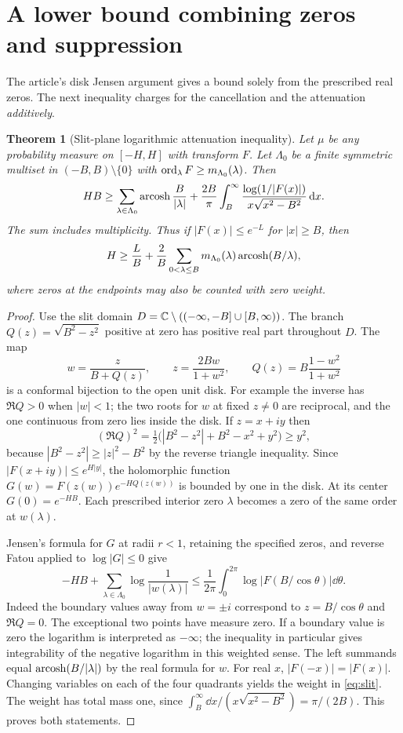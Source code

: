 \documentclass[11pt]{article}
\newtheorem{theorem}{Theorem}[section]
\theoremstyle{definition}\newtheorem{definition}[theorem]{Definition}
\begin{document}
\section{A lower bound combining zeros and suppression}
The article's disk Jensen argument gives a bound solely from the prescribed real zeros. The next inequality charges for the cancellation and the attenuation \emph{additively}.

\begin{theorem}[Slit-plane logarithmic attenuation inequality]\label{thm:slit}
Let $\mu$ be any probability measure on $[-H,H]$ with transform $F$. Let $\Lambda_0$ be a finite symmetric multiset in $(-B,B)\setminus\{0\}$ with $\operatorname{ord}_\lambda F\ge m_{\Lambda_0}(\lambda)$. Then
\begin{equation}\label{eq:slit}
 HB\ge \sum_{\lambda\in\Lambda_0}\operatorname{arcosh}\frac{B}{|\lambda|}
 +\frac{2B}{\pi}\int_B^\infty\frac{\log(1/|F(x)|)}{x\sqrt{x^2-B^2}}\,\mathrm d x.
\end{equation}
The sum includes multiplicity. Thus if $|F(x)|\le e^{-L}$ for $|x|\ge B$, then
\begin{equation}\label{eq:additive}
 H\ge\frac{L}{B}+\frac{2}{B}\sum_{0<\lambda\le B}m_{\Lambda_0}(\lambda)\operatorname{arcosh}(B/\lambda),
\end{equation}
where zeros at the endpoints may also be counted with zero weight.
\end{theorem}
\begin{proof}
Use the slit domain $D=\mathbb C\setminus(({-\infty},-B]\cup[B,\infty))$. The branch $Q(z)=\sqrt{B^2-z^2}$ positive at zero has positive real part throughout $D$. The map
\[
 w=\frac{z}{B+Q(z)},\qquad z=\frac{2Bw}{1+w^2},\qquad Q(z)=B\frac{1-w^2}{1+w^2}
\]
is a conformal bijection to the open unit disk. For example the inverse has $\Re Q>0$ when $|w|<1$; the two roots for $w$ at fixed $z\ne0$ are reciprocal, and the one continuous from zero lies inside the disk. If $z=x+iy$ then
\[
 (\Re Q)^2=\tfrac12\bigl(|B^2-z^2|+B^2-x^2+y^2\bigr)\ge y^2,
\]
because $|B^2-z^2|\ge|z|^2-B^2$ by the reverse triangle inequality. Since $|F(x+iy)|\le e^{H|y|}$, the holomorphic function $G(w)=F(z(w))e^{-H Q(z(w))}$ is bounded by one in the disk. At its center $G(0)=e^{-HB}$. Each prescribed interior zero $\lambda$ becomes a zero of the same order at $w(\lambda)$.

Jensen's formula for $G$ at radii $r<1$, retaining the specified zeros, and reverse Fatou applied to $\log|G|\le0$ give
\[
 -HB+\sum_{\lambda\in\Lambda_0}\log\frac{1}{|w(\lambda)|}
 \le \frac1{2\pi}\int_0^{2\pi}\log|F(B/\cos\theta)|\dd\theta.
\]
Indeed the boundary values away from $w=\pm i$ correspond to $z=B/\cos\theta$ and $\Re Q=0$. The exceptional two points have measure zero. If a boundary value is zero the logarithm is interpreted as $-\infty$; the inequality in particular gives integrability of the negative logarithm in this weighted sense. The left summands equal $\operatorname{arcosh}(B/|\lambda|)$ by the real formula for $w$. For real $x$, $|F(-x)|=|F(x)|$. Changing variables on each of the four quadrants yields the weight in \eqref{eq:slit}. The weight has total mass one, since $\int_B^\infty\dd x/(x\sqrt{x^2-B^2})=\pi/(2B)$. This proves both statements.
\end{proof}
\end{document}
